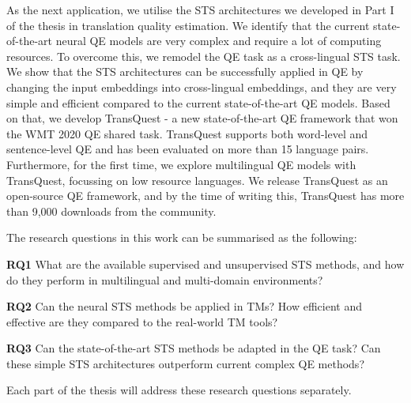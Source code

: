 As the next application, we utilise the STS architectures we developed in Part I of the thesis in translation quality estimation. We identify that the current state-of-the-art neural QE models are very complex and require a lot of computing resources. To overcome this, we remodel the QE task as a cross-lingual STS task.  We show that the STS architectures can be successfully applied in QE by changing the input embeddings into cross-lingual embeddings, and they are very simple and efficient compared to the current state-of-the-art QE models. Based on that, we develop TransQuest - a new state-of-the-art QE framework that won the WMT 2020 QE shared task. TransQuest supports both word-level and sentence-level QE and has been evaluated on more than 15 language pairs. Furthermore, for the first time, we explore multilingual QE models with TransQuest, focussing on low resource languages. We release TransQuest as an open-source QE framework, and by the time of writing this, TransQuest has more than 9,000 downloads from the community. 

The research questions in this work can be summarised as the following:

\textbf{RQ1} What are the available supervised and unsupervised STS methods, and how do they perform in multilingual and multi-domain environments? 

\textbf{RQ2} Can the neural STS methods be applied in TMs? How efficient and effective are they compared to the real-world TM tools?

\textbf{RQ3} Can the state-of-the-art STS methods be adapted in the QE task? Can these simple STS architectures outperform current complex QE methods? 

Each part of the thesis will address these research questions separately.

